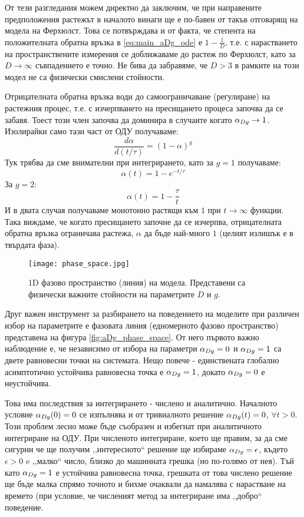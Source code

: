 От тези разгледания можем директно да заключим, че при направените предположения растежът в началото винаги ще е по-бавен от такъв отговарящ на модела на Ферхюлст. Това се потвърждава и от факта, че степента на положителната обратна връзка в \autoref{eq:main_aDg_ode} е $1-\frac{1}{D}$, т.е. с нарастването на пространствените измерения се доближаваме до растеж по Ферхюлст, като за $D \rightarrow \infty$ съвпадението е точно. Не бива да забравяме, че $D > 3$ в рамките на този модел не са физически смислени стойности.

Отрицателната обратна връзка води до самоограничаване (регулиране) на растежния процес, т.е. с изчерпването на пресищането процеса започва да се забавя. Тоест този член започва да доминира в случаите когато $\alpha_{Dg} \rightarrow 1$. Изолирайки само тази част от ОДУ получаваме:
\begin{equation}
	\frac{d\alpha}{d(t/\tau)} = (1-\alpha)^g
\end{equation}
Тук трябва да сме внимателни при интегрирането, като за $g=1$ получаваме:
\begin{equation*}
	\alpha(t) = 1-e^{-t/{\tau}}
\end{equation*}
За $g = 2$:
\begin{equation*}
	\alpha(t) = 1 - \frac{\tau}{t}
\end{equation*}
И в двата случая получаваме монотонно растящи към $1$ при $t \rightarrow \infty$ функции. Така виждаме, че когато пресищането започне да се изчерпва, отрицателната обратна връзка ограничава растежа, $\alpha$ да бъде най-много $1$ (целият излишък е в твърдата фаза).

\begin{figure}[ht]
	\centering
	\texttt{[image: phase\_space.jpg]}
	\caption{1D фазово пространство (линия) на модела. Представени са физически важните стойности на параметрите $D$ и $g$.}
	\label{fig:aDg_phase_space}
\end{figure}

Друг важен инструмент за разбирането на поведението на моделите при различен избор на параметрите е фазовата линия (едномерното фазово пространство) представена на фигура \autoref{fig:aDg_phase_space}. От него първото важно наблюдение е, че независимо от избора на параметри $\alpha_{Dg}  = 0 $ и $\alpha_{Dg} = 1$ са двете равновесни точки на системата. Нещо повече - единствената глобално асимптотично устойчива равновесна точка е $\alpha_{Dg} = 1$, докато $\alpha_{Dg} = 0$ е неустойчива. 

Това има последствия за интегрирането - числено и аналитично. Началното условие $\alpha_{Dg} (0) = 0$ се изпълнява и от тривиалното решение $\alpha_{Dg}(t) = 0$, $\forall t > 0$. Този проблем лесно може бъде съобразен и избегнат при аналитичното интегриране на ОДУ. При численото интегриране, което ще правим, за да сме сигурни че ще получим ,,интересното`` решение ще избираме $\alpha_{Dg} = \epsilon$, където $\epsilon > 0$ e ,,малко`` число, близко до машинната грешка (но по-голямо от нея). Тъй като  $\alpha_{Dg} = 1$ е устойчива равновесна точка, грешката от това числено решение ще бъде малка спрямо точното и бихме очаквали да намалява с нарастване на времето (при условие, че численият метод за интегриране има ,,добро`` поведение.

